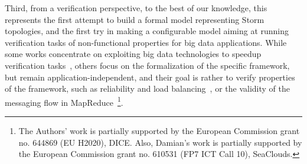 Third, from a verification perspective, to the best of our knowledge, this represents the first attempt to build a formal model representing Storm topologies, and the first try in making a configurable model aiming at running verification tasks of non-functional properties for big data applications. While some works concentrate on exploiting big data technologies to speedup verification tasks~\cite{camilli2014}, others focus on the formalization of the specific framework, but remain application-independent, and their goal is rather to verify properties of the framework, such as reliability and load balancing~\cite{dicomputational}, or the validity of the messaging flow in MapReduce~\cite{yang2010formalizing}\footnote{The Authors' work is partially supported by the European Commission grant no. 644869 (EU H2020), DICE. Also, Damian's work is partially supported by the European Commission grant no. 610531 (FP7 ICT Call 10), SeaClouds.}.
%
%
